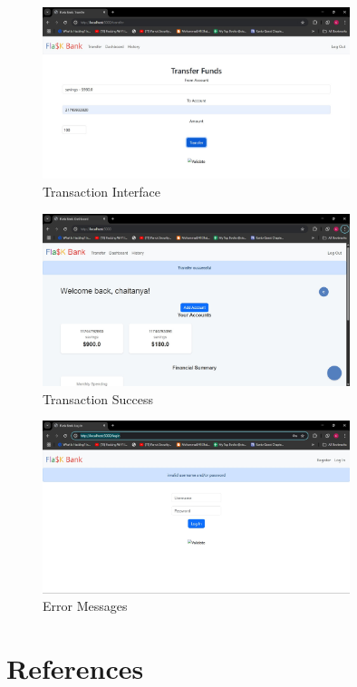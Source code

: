 \begin{figure}[h]
  \centering
  \includegraphics[width=0.8\textwidth]{flask_assets/transfers.jpg}
  \caption{Transaction Interface}
\end{figure}

\begin{figure}[h]
  \centering
  \includegraphics[width=0.8\textwidth]{flask_assets/transfer_success.jpg}
  \caption{Transaction Success}
\end{figure}

\begin{figure}[h]
  \centering
  \includegraphics[width=0.8\textwidth]{flask_assets/error.jpg}
  \caption{Error Messages}
\end{figure}

\chapter{References}

